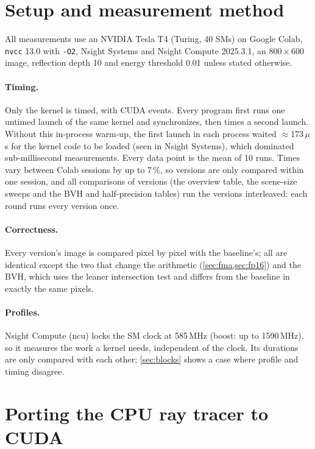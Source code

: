 \documentclass[11pt,a4paper]{article}
\begin{document}
\section{Setup and measurement method}
\label{sec:method}

All measurements use an NVIDIA Tesla T4 (Turing, 40 SMs) on Google Colab, \texttt{nvcc} 13.0 with
\texttt{-O2}, Nsight Systems and Nsight Compute 2025.3.1, an $800 \times 600$ image, reflection
depth 10 and energy threshold 0.01 unless stated otherwise.

\paragraph{Timing.} Only the kernel is timed, with CUDA events. Every program first runs one untimed
launch of the same kernel and synchronizes, then times a second launch. Without this in-process
warm-up, the first launch in each process waited $\approx$173\,$\mu$s for the kernel code to be
loaded (seen in Nsight Systems), which dominated sub-millisecond measurements. Every data point is the
mean of 10 runs. Times vary between Colab sessions by up to 7\,\%, so versions are only compared
within one session, and all comparisons of versions (the overview table, the scene-size sweeps and
the BVH and half-precision tables) run the versions interleaved: each round runs every version once.

\paragraph{Correctness.} Every version's image is compared pixel by pixel with the baseline's; all
are identical except the two that change the arithmetic (\cref{sec:fma,sec:fp16}) and the BVH,
which uses the leaner intersection test and differs from the baseline in exactly the same pixels.

\paragraph{Profiles.} Nsight Compute (ncu) locks the SM clock at 585\,MHz (boost: up to 1590\,MHz),
so it measures the work a kernel needs, independent of the clock. Its durations are only compared
with each other; \cref{sec:blocks} shows a case where profile and timing disagree.

\section{Porting the CPU ray tracer to CUDA}
\label{sec:port}
\end{document}
